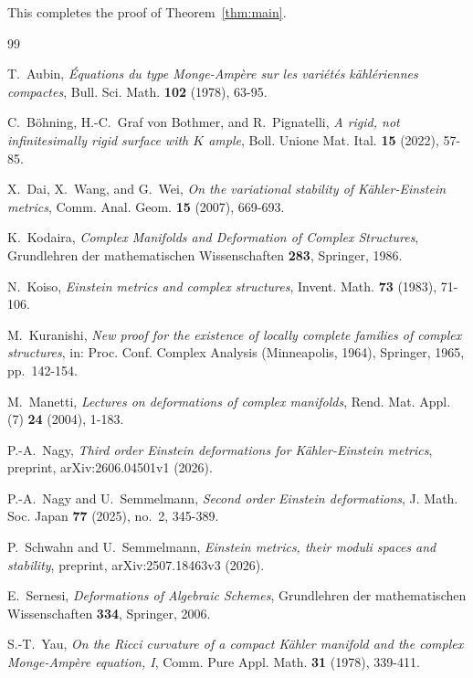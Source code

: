 \documentclass[11pt]{amsart}
\numberwithin{equation}{section}
\theoremstyle{plain}
\theoremstyle{definition}
\begin{document}
This completes the proof of Theorem~\ref{thm:main}.
\begin{thebibliography}{99}

T.~Aubin, \emph{\'Equations du type Monge-Amp\`ere sur les vari\'et\'es k\"ahl\'eriennes compactes}, Bull. Sci. Math. \textbf{102} (1978), 63-95.

C.~B\"ohning, H.-C.~Graf von Bothmer, and R.~Pignatelli, \emph{A rigid, not infinitesimally rigid surface with $K$ ample}, Boll. Unione Mat. Ital. \textbf{15} (2022), 57-85.

X.~Dai, X.~Wang, and G.~Wei, \emph{On the variational stability of K\"ahler-Einstein metrics}, Comm. Anal. Geom. \textbf{15} (2007), 669-693.

K.~Kodaira, \emph{Complex Manifolds and Deformation of Complex Structures}, Grundlehren der mathematischen Wissenschaften \textbf{283}, Springer, 1986.

N.~Koiso, \emph{Einstein metrics and complex structures}, Invent. Math. \textbf{73} (1983), 71-106.

M.~Kuranishi, \emph{New proof for the existence of locally complete families of complex structures}, in: Proc. Conf. Complex Analysis (Minneapolis, 1964), Springer, 1965, pp.~142-154.

M.~Manetti, \emph{Lectures on deformations of complex manifolds}, Rend. Mat. Appl. (7) \textbf{24} (2004), 1-183.

P.-A.~Nagy, \emph{Third order Einstein deformations for K\"ahler-Einstein metrics}, preprint, arXiv:2606.04501v1 (2026).

P.-A.~Nagy and U.~Semmelmann, \emph{Second order Einstein deformations}, J. Math. Soc. Japan \textbf{77} (2025), no.~2, 345-389.

P.~Schwahn and U.~Semmelmann, \emph{Einstein metrics, their moduli spaces and stability}, preprint, arXiv:2507.18463v3 (2026).

E.~Sernesi, \emph{Deformations of Algebraic Schemes}, Grundlehren der mathematischen Wissenschaften \textbf{334}, Springer, 2006.

S.-T.~Yau, \emph{On the Ricci curvature of a compact K\"ahler manifold and the complex Monge-Amp\`ere equation, I}, Comm. Pure Appl. Math. \textbf{31} (1978), 339-411.

\end{thebibliography}
\end{document}
